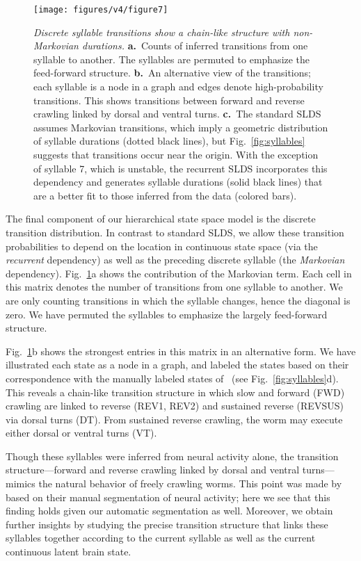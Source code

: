 \documentclass[11pt]{article}
\begin{document}
\begin{figure}[t!]
\centering
\texttt{[image: figures/v4/figure7]} 
\caption{ \textit{Discrete syllable transitions show a chain-like
    structure with non-Markovian durations.}  \textbf{a.}~Counts of
  inferred transitions from one syllable to another. The syllables are
  permuted to emphasize the feed-forward structure.  \textbf{b.}~An
  alternative view of the transitions; each syllable is a node in a graph
  and edges denote high-probability transitions.  This shows
  transitions between forward and reverse crawling linked by dorsal
  and ventral turns.  \textbf{c.}~The standard SLDS assumes Markovian
  transitions, which imply a geometric distribution of syllable durations
  (dotted black lines), but Fig.~\ref{fig:syllables} suggests that
  transitions occur near the origin.  With the exception of
  syllable 7, which is unstable, the recurrent SLDS incorporates this
  dependency and generates syllable durations (solid black lines) that
  are a better fit to those inferred from the data (colored bars).  }
\label{fig:recurrent}
\end{figure}

The final component of our hierarchical state space model is the
discrete transition distribution.  In contrast to standard SLDS, we
allow these transition probabilities to depend on the location in
continuous state space (via the \emph{recurrent} dependency) as well as
the preceding discrete syllable (the \emph{Markovian} dependency).
Fig.~\ref{fig:recurrent}a shows the contribution of the Markovian
term.  Each cell in this matrix denotes the number of transitions from
one syllable to another. We are only counting transitions in which the
syllable changes, hence the diagonal is zero.  We have permuted the
syllables to emphasize the largely feed-forward structure.

Fig.~\ref{fig:recurrent}b shows the strongest entries in this matrix
in an alternative form.  We have illustrated each state as a node in a
graph, and labeled the states based on their correspondence with the
manually labeled states of~\citet{kato2015global} (see
Fig.~\ref{fig:syllables}d).  This reveals a chain-like transition
structure in which slow and forward (\textsf{FWD}) crawling are linked
to reverse (\textsf{REV1}, \textsf{REV2}) and sustained reverse
(\textsf{REVSUS}) via dorsal turns (\textsf{DT}). From sustained
reverse crawling, the worm may execute either dorsal or ventral turns
(\textsf{VT}).

Though these syllables were inferred from neural activity alone, the
transition structure---forward and reverse crawling linked by dorsal
and ventral turns---mimics the natural behavior of freely crawling
worms.  This point was made by~\citet{kato2015global} based on their
manual segmentation of neural activity; here we see that this finding
holds given our automatic segmentation as well.  Moreover, we obtain
further insights by studying the precise transition structure that
links these syllables together according to the current syllable
as well as the current continuous latent brain state. 
\end{document}
